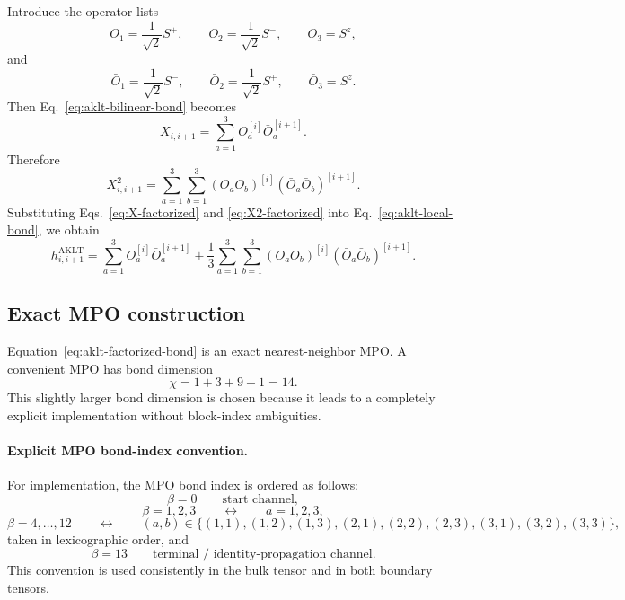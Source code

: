 \documentclass[aps,prb,onecolumn,nofootinbib]{revtex4-2}
\begin{document}
	Introduce the operator lists
	\begin{equation}
		O_1 = \frac{1}{\sqrt{2}}S^+,\qquad
		O_2 = \frac{1}{\sqrt{2}}S^-,\qquad
		O_3 = S^z,
	\end{equation}
	and
	\begin{equation}
		\bar O_1 = \frac{1}{\sqrt{2}}S^-,\qquad
		\bar O_2 = \frac{1}{\sqrt{2}}S^+,\qquad
		\bar O_3 = S^z.
	\end{equation}
	Then Eq.~\eqref{eq:aklt-bilinear-bond} becomes
	\begin{equation}
		X_{i,i+1}
		=
		\sum_{a=1}^3 O_a^{[i]} \bar O_a^{[i+1]}.
		\label{eq:X-factorized}
	\end{equation}
	Therefore
	\begin{equation}
		X_{i,i+1}^2
		=
		\sum_{a=1}^3 \sum_{b=1}^3
		\left(O_a O_b\right)^{[i]}
		\left(\bar O_a \bar O_b\right)^{[i+1]}.
		\label{eq:X2-factorized}
	\end{equation}
	Substituting Eqs.~\eqref{eq:X-factorized} and \eqref{eq:X2-factorized} into Eq.~\eqref{eq:aklt-local-bond}, we obtain
	\begin{equation}
		h_{i,i+1}^{\mathrm{AKLT}}
		=
		\sum_{a=1}^3 O_a^{[i]} \bar O_a^{[i+1]}
		+
		\frac13
		\sum_{a=1}^3 \sum_{b=1}^3
		\left(O_a O_b\right)^{[i]}
		\left(\bar O_a \bar O_b\right)^{[i+1]}.
		\label{eq:aklt-factorized-bond}
	\end{equation}
	
	\subsection{Exact MPO construction}
	
	Equation~\eqref{eq:aklt-factorized-bond} is an exact nearest-neighbor MPO. A convenient MPO has bond dimension
	\[
	\chi = 1 + 3 + 9 + 1 = 14.
	\]
	This slightly larger bond dimension is chosen because it leads to a completely explicit implementation without block-index ambiguities.
	
	\paragraph{Explicit MPO bond-index convention.}
	For implementation, the MPO bond index is ordered as follows:
	\begin{equation}
		\beta = 0
		\qquad \text{start channel},
	\end{equation}
	\begin{equation}
		\beta = 1,2,3
		\qquad \leftrightarrow \qquad
		a=1,2,3,
	\end{equation}
	\begin{equation}
		\beta = 4,\dots,12
		\qquad \leftrightarrow \qquad
		(a,b)\in
		\{(1,1),(1,2),(1,3),(2,1),(2,2),(2,3),(3,1),(3,2),(3,3)\},
		\label{eq:aklt-lexicographic-order}
	\end{equation}
	taken in lexicographic order, and
	\begin{equation}
		\beta = 13
		\qquad \text{terminal / identity-propagation channel}.
	\end{equation}
	This convention is used consistently in the bulk tensor and in both boundary tensors.
	
\end{document}
